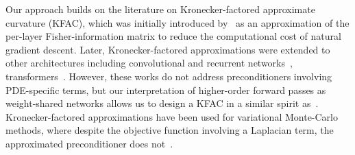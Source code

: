 Our approach builds on the literature on Kronecker-factored approximate curvature (KFAC), which was initially introduced by~\citet{heskes2000natural, martens2010deep} as an approximation of the per-layer Fisher-information matrix to reduce the computational cost of natural gradient descent. %
Later, Kronecker-factored approximations were extended to other architectures including convolutional and recurrent networks~\citep{grosse2016kroneckerfactored, martens2018kroneckerfactored}, transformers~\citep{zhang2019algorithmic, pauloski2021kaisa, osawa2023pipefisher, grosse2023studying}. %
However, these works do not address preconditioners involving PDE-specific terms, but our interpretation of higher-order forward passes as weight-shared networks allows us to design a KFAC in a similar spirit as~\cite{eschenhagen2023kroneckerfactored}. 
Kronecker-factored approximations have been used for variational Monte-Carlo methods, where despite the objective function involving a Laplacian term, the approximated preconditioner does not~\citep{pfau2020ab,drissi2024second}. 



